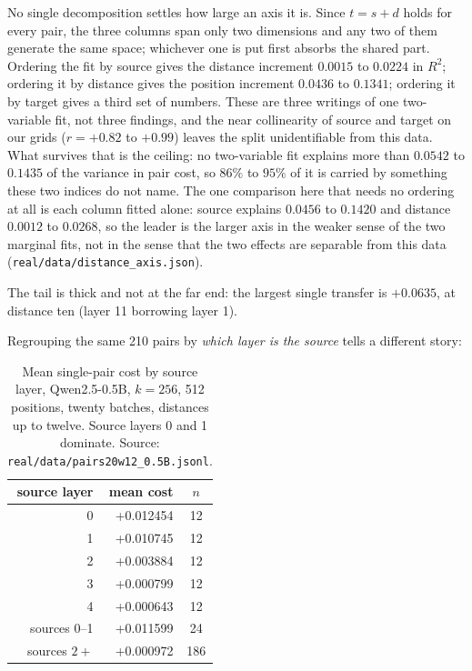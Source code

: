 \documentclass[10pt]{article}
\begin{document}
No single decomposition settles how large an axis it is.
Since $t = s + d$ holds for every pair, the three columns span only two
dimensions and any two of them generate the same space; whichever one is put
first absorbs the shared part. Ordering the fit by source gives the distance
increment $0.0015$ to $0.0224$ in $R^2$; ordering it by distance gives the
position increment $0.0436$ to $0.1341$; ordering it by target gives a third
set of numbers. These are three writings of one two-variable fit, not three
findings, and the near collinearity of source and target on our grids
($r = +0.82$ to $+0.99$) leaves the split unidentifiable from this data. What
survives that is the ceiling: no two-variable fit explains more than
$0.0542$ to $0.1435$ of the variance in pair cost, so $86\%$ to $95\%$ of it
is carried by something these two indices do not name. The one comparison
here that needs no ordering at all is each column fitted alone: source
explains $0.0456$ to $0.1420$ and distance $0.0012$ to $0.0268$, so the
leader is the larger axis in the weaker sense of the two marginal fits, not
in the sense that the two effects are separable from this data
(\texttt{real/data/distance\_axis.json}).

The tail is thick and not at the far end: the largest single transfer is
$+0.0635$, at distance ten (layer 11 borrowing layer 1).

Regrouping the same 210 pairs by \emph{which layer is the source} tells a
different story:

\begin{table}[h]
\centering
\caption{Mean single-pair cost by source layer, Qwen2.5-0.5B, $k=256$,
512 positions, twenty batches, distances up to twelve. Source layers 0 and 1
dominate. Source: \texttt{real/data/pairs20w12\_0.5B.jsonl}.}
\label{tab:leader}
\begin{tabular}{rrc}
\toprule
source layer & mean cost & $n$ \\
\midrule
0 & +0.012454 & 12 \\
1 & +0.010745 & 12 \\
2 & +0.003884 & 12 \\
3 & +0.000799 & 12 \\
4 & +0.000643 & 12 \\
\midrule
sources 0--1 & +0.011599 & 24 \\
sources $2+$  & +0.000972 & 186 \\
\bottomrule
\end{tabular}
\end{table}
\end{document}
